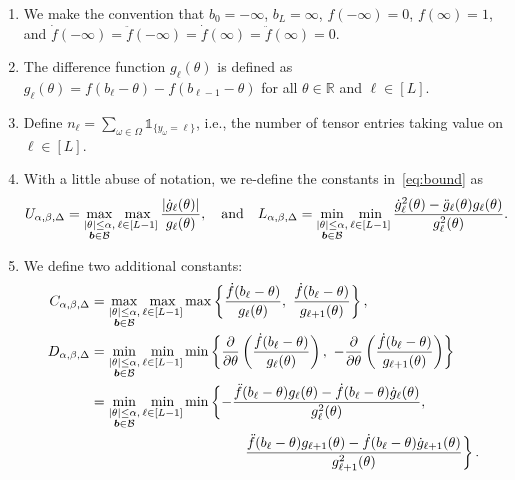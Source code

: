 \documentclass[11pt]{article}
\theoremstyle{plain}
\theoremstyle{definition}
\begin{document}
\begin{enumerate}
\item We make the convention that $b_0=-\infty$, $b_L=\infty$, $f(-\infty)=0$, $f(\infty)=1$, and $\dot{f}(-\infty)=\ddot{f}(-\infty)=\dot{f}(\infty)=\ddot{f}(\infty)=0$.

\item The difference function $g_\ell(\theta)$ is defined as $g_\ell(\theta)=f(b_\ell-\theta)-f(b_{\ell-1}-\theta)$ for all $\theta\in\mathbb{R}$ and $\ell\in[L]$.

\item Define $n_\ell=\sum_{\omega\in\Omega}\mathds{1}_{\{y_\omega=\ell\}}$, i.e., the number of tensor entries taking value on $\ell\in[L]$.

\item With a little abuse of notation, we re-define the constants in~\eqref{eq:bound} as
\begin{equation}\label{eq:UL}
U_{\alpha,\beta,\Delta}=\max_{ \substack{|\theta|\leq \alpha,\\ \bm{b} \in\mathcal{B}}}\max_{\ell\in[L-1]}{|\dot{g}_\ell(\theta)|\over g_\ell(\theta)}, \quad \text{and}\quad
L_{\alpha,\beta,\Delta}=\min_{ \substack{|\theta|\leq \alpha,\\ \bm{b} \in\mathcal{B}}}\min_{\ell\in[L-1]} {\dot{g}^2_\ell(\theta)-\ddot{g}_\ell(\theta)g_\ell(\theta)\over g^2_\ell(\theta)}.
\end{equation}
\item We define two additional constants:
\begin{align}\label{eq:CD}
C_{\alpha,\beta,\Delta} &= \max_{ \substack{|\theta|\leq \alpha,\\ \mb \in\tB}}  \max_{\ell\in[L-1]}\max\left\{\frac{\dot{f}(b_\ell-\theta)}{g_\ell(\theta)},\ \frac{\dot{f}(b_\ell-\theta)}{g_{\ell+1}(\theta)}\right\},\notag \\
D_{\alpha,\beta,\Delta} &=\min_{ \substack{|\theta|\leq \alpha,\\ \mb \in\tB}} \min_{\ell\in[L-1]}\min\left\{  {\partial \over \partial \theta}\left({\dot{f}(b_{\ell}-\theta)\over g_\ell(\theta)}\right),\ -{\partial \over \partial \theta}\left({\dot{f}(b_{\ell}-\theta)\over g_{\ell+1}(\theta)}\right)\right\}\notag \\
&=  \min_{ \substack{|\theta|\leq \alpha,\\ \mb \in\tB}}\min_{\ell\in[L-1]}\min \left\{-\frac{\ddot{f}(b_\ell-\theta)g_\ell(\theta)-\dot{f}(b_\ell-\theta)\dot{g}_\ell(\theta)}{g^2_\ell(\theta)},\ \right. \notag \\
&\hspace{1.5in} \left. \frac{\ddot{f}(b_\ell-\theta)g_{\ell+1}(\theta)-\dot{f}(b_\ell-\theta)\dot{g}_{\ell+1}(\theta)}{g^2_{\ell+1}(\theta)}\right\}.
\end{align}
\end{enumerate}
\end{document}
